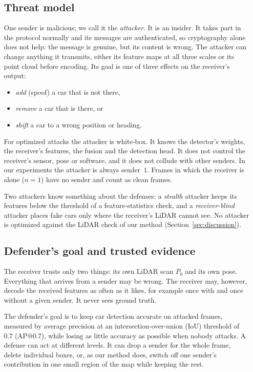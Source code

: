 \documentclass[conference]{IEEEtran}
\begin{document}
\subsection{Threat model}
One sender is malicious; we call it the \emph{attacker}. It is an insider. It takes part in the protocol
normally and its messages are authenticated, so cryptography alone does not help: the message is genuine, but
its content is wrong. The attacker can change anything it transmits, either its feature maps at all three
scales or its point cloud before encoding. Its goal is one of three effects on the receiver's output:
\begin{itemize}
\item \emph{add} (spoof) a car that is not there,
\item \emph{remove} a car that is there, or
\item \emph{shift} a car to a wrong position or heading.
\end{itemize}
For optimized attacks the attacker is white-box. It knows the detector's weights, the receiver's features, the
fusion and the detection head. It does not control the receiver's sensor, pose or software, and it does not
collude with other senders. In our experiments the attacker is always sender~$1$. Frames in which the receiver
is alone ($n=1$) have no sender and count as clean frames.

Two attackers know something about the defenses: a \emph{stealth} attacker keeps its features below the
threshold of a feature-statistics check, and a \emph{receiver-blind} attacker places fake cars only where the
receiver's LiDAR cannot see. No attacker is optimized against the LiDAR check of our method
(Section~\ref{sec:discussion}).

\subsection{Defender's goal and trusted evidence}
The receiver trusts only two things: its own LiDAR scan $P_0$ and its own pose. Everything that arrives from a
sender may be wrong. The receiver may, however, decode the received features as often as it likes, for example
once with and once without a given sender. It never sees ground truth.

The defender's goal is to keep car detection accurate on attacked frames, measured by average precision at an intersection-over-union (IoU) threshold of $0.7$ (AP@0.7), while losing as little accuracy as possible when nobody
attacks. A defense can act at different levels. It can drop a sender for the whole frame, delete individual
boxes, or, as our method does, switch off one sender's contribution in one small region of the map while keeping
the rest.
\end{document}
